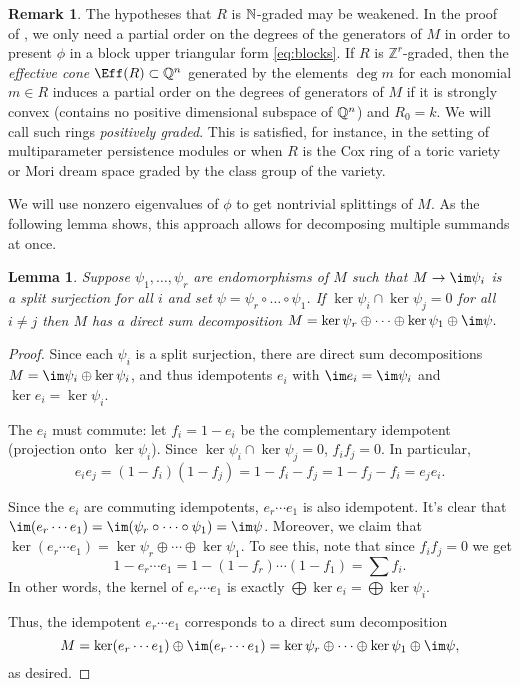 \documentclass[12pt]{article}
\def\ZZ{\mathbb Z}
\theoremstyle{theorem}
\numberwithin{thm}{section}
\newtheorem{lem}[thm]{Lemma}
\theoremstyle{definition}
\newtheorem{rem}[thm]{Remark}
\begin{document}
\begin{rem}\label{rem:grading}
  The hypotheses that $R$ is $\mathbb N$-graded may be weakened. In the proof of , we only need a partial order on the degrees of the generators of $M$ in order to present $\phi$ in a block upper triangular form \eqref{eq:blocks}. If $R$ is $\ZZ^r$-graded, then the \emph{effective cone} $\Eff(R)\subset\Q^n$ generated by the elements $\deg m$ for each monomial $m \in R$ induces a partial order on the degrees of generators of $M$ if it is strongly convex (contains no positive dimensional subspace of $\mathbb Q^n$) and $R_0 = k$. We will call such rings \emph{positively graded}. %
  This is satisfied, for instance, in the setting of multiparameter persistence modules or when $R$ is the Cox ring of a toric variety or Mori dream space graded by the class group of the variety.
\end{rem}

We will use nonzero eigenvalues of $\phi$ to get nontrivial splittings of $M$. As the following lemma shows, this approach allows for decomposing multiple summands at once.

\begin{lem}\label{lem:decomposition}
  Suppose $\psi_1,\dots,\psi_r$ are endomorphisms of $M$ such that $M\to\im\psi_i$ is a split surjection for all $i$ and set $\psi = \psi_r\circ\dots\circ\psi_1$.
  If $\ker\psi_i\cap\ker \psi_j = 0$ for all $i\neq j$ then $M$ has a direct sum decomposition \( M = \ker\psi_r \oplus \cdots \oplus \ker\psi_1 \oplus \im\psi. \)
\end{lem}
\begin{proof}
  Since each $\psi_i$ is a split surjection, there are direct sum decompositions $M=\im \psi_i \oplus \ker \psi_i$, and thus idempotents $e_i$ with $\im e_i = \im \psi_i$ and $\ker e_i = \ker \psi_i$.

  The $e_i$ must commute: let $f_i = 1- e_i$ be the complementary idempotent (projection onto $\ker \psi_i$). Since $\ker \psi_i \cap \ker \psi_j=0$, $f_if_j=0$. In particular,
  \[ e_ie_j =(1-f_i)(1-f_j) = 1-f_i-f_j= 1-f_j-f_i = e_j e_i. \]

  Since the $e_i$ are commuting idempotents, $e_r\cdots e_1$ is also idempotent. It's clear that $\im(e_r\cdots e_1) = \im (\psi_r\circ \dots\circ \psi_1) = \im \psi$. Moreover, we claim that $\ker(e_r\cdots e_1) = \ker \psi_r \oplus \cdots \oplus \ker \psi_1$. To see this, note that since $f_if_j=0$ we get
  \[ 1-e_r\cdots e_1 = 1-(1-f_r)\cdots (1-f_1) = \sum f_i. \]
  In other words, the kernel of $e_r\cdots e_1$ is exactly $\bigoplus \ker e_i =\bigoplus \ker \psi_i$.

  Thus, the idempotent $e_r\cdots e_1$ corresponds to a direct sum decomposition
  \[ M = \ker(e_r\cdots e_1) \oplus \im(e_r\cdots e_1) = \ker\psi_r \oplus \cdots \oplus \ker\psi_1 \oplus \im\psi, \]
  as desired.
\end{proof}
\end{document}

